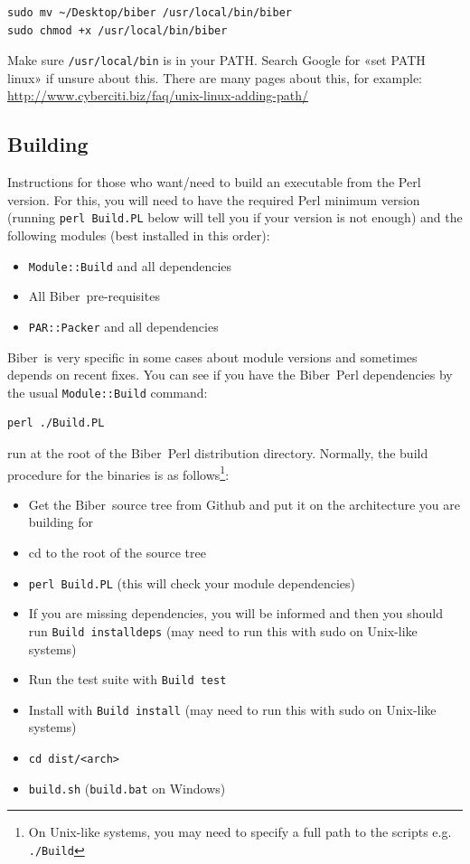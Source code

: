 \documentclass{ltxdockit}
\newcommand*{\biber}{Biber\xspace}
\begin{document}
\begin{verbatim}
sudo mv ~/Desktop/biber /usr/local/bin/biber
sudo chmod +x /usr/local/bin/biber
\end{verbatim}

\noindent Make sure \verb+/usr/local/bin+ is in your PATH. Search Google for «set PATH
linux» if unsure about this. There are many pages about this, for example:
\url{http://www.cyberciti.biz/faq/unix-linux-adding-path/}

\subsection{Building}

Instructions for those who want/need to build an executable from the
Perl version. For this, you will need to have the required Perl minimum
version (running \verb+perl Build.PL+ below will tell you if your version
is not enough) and the following modules (best installed in this order):

\begin{itemize}
\item \verb+Module::Build+ and all dependencies
\item All \biber\ pre-requisites
\item \verb+PAR::Packer+ and all dependencies
\end{itemize}

\noindent \biber\ is very specific in some cases about module versions and
sometimes depends on recent fixes. You can see if you have the
\biber\ Perl dependencies by the usual \verb+Module::Build+ command:

\begin{verbatim}
perl ./Build.PL
\end{verbatim}

\noindent run at the root of the \biber\ Perl distribution
directory. Normally, the build procedure for the binaries is as
follows\footnote{On Unix-like systems, you may need to specify a full
  path to the scripts e.g. \texttt{./Build}}:

\begin{itemize}
\item Get the \biber\ source tree from Github and put it on the architecture
  you are building for
\item cd to the root of the source tree
\item \verb+perl Build.PL+ (this will check your module dependencies)
\item If you are missing dependencies, you will be informed and then you
  should run \verb+Build installdeps+ (may need to run this with sudo on
  Unix-like systems)
\item Run the test suite with \verb+Build test+
\item Install with \verb+Build install+ (may need to run this with sudo on
  Unix-like systems)
\item \verb+cd dist/<arch>+
\item \verb+build.sh+ (\verb+build.bat+ on Windows)
\end{itemize}
\end{document}
